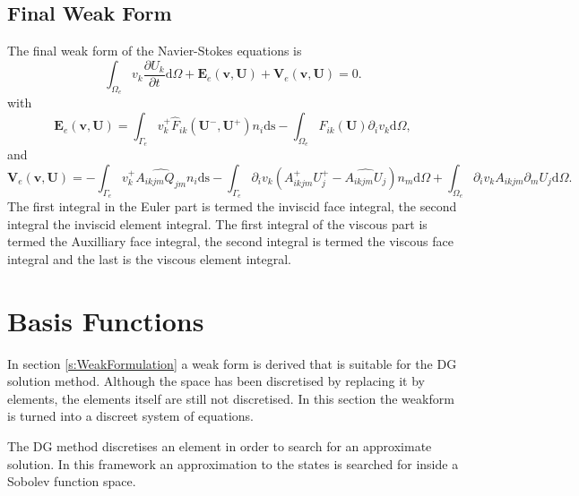 \documentclass{report}
\newcommand{\dt}[1]{\frac{\partial #1}{\partial t}}
\begin{document}
\subsection{Final Weak Form}
The final weak form of the Navier-Stokes equations is
\begin{equation}
\label{e:weakformFinal}
\int_{\Omega_e} v_k \dt{U_k} \mathrm{d}\Omega
+ \mathbf{E}_e(\mathbf{v},\mathbf{U})
+ \mathbf{V}_e(\mathbf{v},\mathbf{U}) = 0.
\end{equation}
with
\begin{equation}
\mathbf{E}_e(\mathbf{v},\mathbf{U}) = 
\int_{\Gamma_e} v_k^{+} \hat{F}_{ik}(\mathbf{U}^{-},\mathbf{U}^{+}) n_i \mathrm{ds}
- \int_{\Omega_e} {F}_{ik}(\mathbf{U}) \partial_i v_k \mathrm{d}\Omega,
\end{equation}
and
\begin{equation}
\mathbf{V}_e(\mathbf{v},\mathbf{U}) = 
- \int_{\Gamma_e} v_k^{+} \widehat{{{A}_{ikjm} Q_{jm}}} n_i \mathrm{ds}
- \int_{\Gamma_e} \partial_i v_k (A_{ikjm}^+ U_j^{+} - \widehat{A_{ikjm} U_j})n_m \mathrm{d}\Omega
+ \int_{\Omega_e} \partial_i v_k A_{ikjm} \partial_m U_j \mathrm{d}\Omega.
\end{equation}
The first integral in the Euler part is termed the inviscid face integral, the second integral the inviscid element integral. The first integral of the viscous part is termed the Auxilliary face integral, the second integral is termed the viscous face integral and the last is the viscous element integral.

\section{Basis Functions}
\label{s:BasisFunctions}
In section \ref{s:WeakFormulation} a weak form is derived that is suitable for the DG solution method. Although the space has been discretised by replacing it by elements, the elements itself are still not discretised. In this section the weakform is turned into a discreet system of equations.

The DG method discretises an element in order to search for an approximate solution. In this framework an approximation to the states is searched for inside a Sobolev function space.
\end{document}
